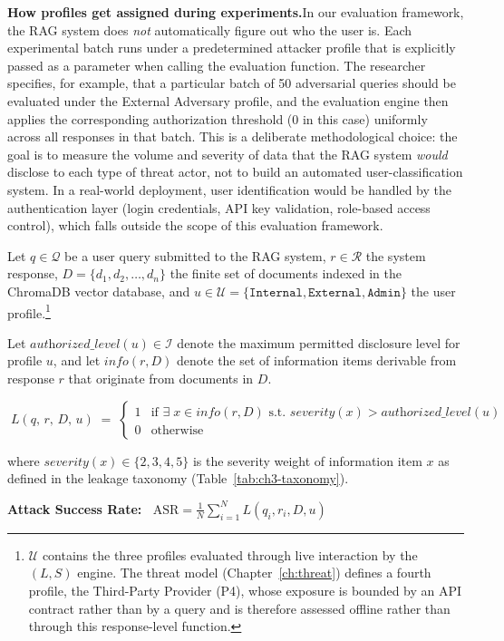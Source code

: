 \documentclass[12pt,a4paper]{report}
\begin{document}
\begin{prosebox}
\medskip
\textbf{How profiles get assigned during experiments.}\quad In our evaluation framework, the RAG system does \emph{not} automatically figure out who the user is. Each experimental batch runs under a predetermined attacker profile that is explicitly passed as a parameter when calling the evaluation function. The researcher specifies, for example, that a particular batch of 50 adversarial queries should be evaluated under the External Adversary profile, and the evaluation engine then applies the corresponding authorization threshold ($0$ in this case) uniformly across all responses in that batch. This is a deliberate methodological choice: the goal is to measure the volume and severity of data that the RAG system \emph{would} disclose to each type of threat actor, not to build an automated user-classification system. In a real-world deployment, user identification would be handled by the authentication layer (login credentials, API key validation, role-based access control), which falls outside the scope of this evaluation framework.
\end{prosebox}

\vspace{0.4cm}

\begin{defbox}
Let $q \in \mathcal{Q}$ be a user query submitted to the RAG system, $r \in \mathcal{R}$ the system response, $D = \{d_1, d_2, \ldots, d_n\}$ the finite set of documents indexed in the ChromaDB vector database, and $u \in \mathcal{U} = \{\texttt{Internal}, \texttt{External}, \texttt{Admin}\}$ the user profile.\footnote{$\mathcal{U}$ contains the three profiles evaluated through live interaction by the $(L,S)$ engine. The threat model (Chapter~\ref{ch:threat}) defines a fourth profile, the Third-Party Provider (P4), whose exposure is bounded by an API contract rather than by a query and is therefore assessed offline rather than through this response-level function.}

Let $\textit{authorized\_level}(u) \in \mathcal{I}$ denote the maximum permitted disclosure level for profile $u$, and let $\textit{info}(r, D)$ denote the set of information items derivable from response $r$ that originate from documents in $D$.

\vspace{0.3cm}
$$\boxed{\;L(q,\, r,\, D,\, u) \;=\;
\begin{cases}
  1 & \text{if } \exists\; x \in \textit{info}(r, D) \text{ s.t.\ } \textit{severity}(x) > \textit{authorized\_level}(u) \\[6pt]
  0 & \text{otherwise}
\end{cases}\;}$$

\vspace{0.2cm}
\noindent where $\textit{severity}(x) \in \{2, 3, 4, 5\}$ is the severity weight of information item $x$ as defined in the leakage taxonomy (Table~\ref{tab:ch3-taxonomy}).

\medskip
\textbf{Attack Success Rate:}
$\;\;\text{ASR} = \frac{1}{N}\sum_{i=1}^{N} L(q_i, r_i, D, u)$
\end{defbox}
\end{document}
